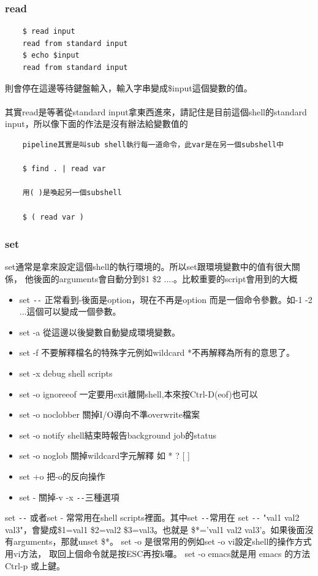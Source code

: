     \subsubsection{read}
    \begin{verbatim}
    $ read input
    read from standard input
    $ echo $input
    read from standard input
    \end{verbatim}
    則會停在這邊等待鍵盤輸入，輸入字串變成\$input這個變數的值。
    \\\\
    其實read是等著從standard input拿東西進來，請記住是目前這個shell的standard
    input，所以像下面的作法是沒有辦法給變數值的
    \begin{verbatim}
    pipeline其實是叫sub shell執行每一道命令，此var是在另一個subshell中

    $ find . | read var

    用( )是喚起另一個subshell

    $ ( read var )
    \end{verbatim}
    \subsubsection{set}
    set通常是拿來設定這個shell的執行環境的。所以set跟環境變數中的值有很大關係，
    他後面的arguments會自動分到\$1 \$2 ....。比較重要的script會用到的大概
    \begin{itemize}
    \item set \verb=--= 正常看到-後面是option，現在不再是option
		而是一個命令參數。如-1 -2 ...這個可以變成一個參數。
    \item set -a 從這邊以後變數自動變成環境變數。
    \item set -f 不要解釋檔名的特殊字元例如wildcard *不再解釋為所有的意思了。
    \item set -x debug shell scripts
    \item set -o ignoreeof   一定要用exit離開shell,本來按Ctrl-D(eof)也可以
    \item set -o noclobber   關掉I/O導向不準overwrite檔案
    \item set -o notify      shell結束時報告background job的status
    \item set -o noglob      關掉wildcard字元解釋 如 * ? [ ]
    \item set +o 把-o的反向操作
    \item set -  關掉-v -x \verb=--=三種選項
    \end{itemize}
    set \verb=--= 或者set - 常常用在shell scripts裡面。其中set \verb=--=常用在
    set \verb=--= "val1 val2 val3"，會變成\$1=val1 \$2=val2 \$3=val3。也就是
    \$*='val1 val2 val3'。如果後面沒有arguments，那就unset \$*。
    set -o 是很常用的例如set -o vi設定shell的操作方式用vi方法，
    取回上個命令就是按ESC再按k囉。 set -o emacs就是用 emacs 的方法 Ctrl-p 
    或上鍵。
